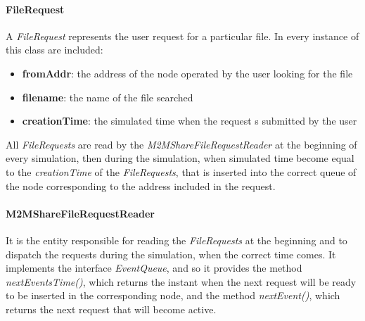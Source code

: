 \paragraph{FileRequest}
A \textit{FileRequest} represents the user request for a particular file. In every instance of this class are included:
\begin{itemize}
\item \textbf{fromAddr}: the address of the node operated by the user looking for the file
\item \textbf{filename}: the name of the file searched
\item \textbf{creationTime}: the simulated time when the request s submitted by the user 
\end{itemize}
All \textit{FileRequests} are read by the \textit{M2MShareFileRequestReader} at the beginning of every simulation, then during the simulation, when simulated time become equal to the \textit{creationTime} of the \textit{FileRequests}, that is inserted into the correct queue of the node corresponding to the address included in the request.

\paragraph{M2MShareFileRequestReader}
It is the entity responsible for reading the \textit{FileRequests} at the beginning and to dispatch the requests during the simulation, when the correct time comes. It implements the interface \textit{EventQueue}, and so it provides the method \textit{nextEventsTime()}, which returns the instant when the next request will be ready to be inserted in the corresponding node, and the method \textit{nextEvent()}, which returns the next request that will become active.


